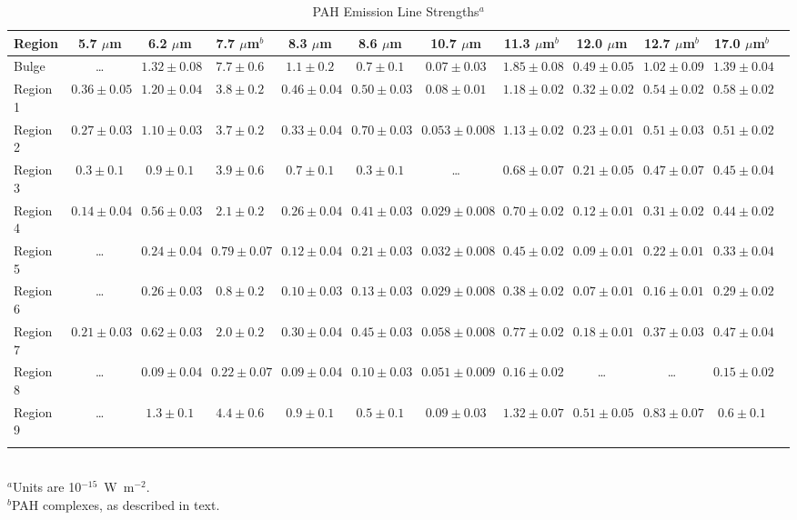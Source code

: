 \documentclass[useAMS,usenatbib,a4paper]{mn2e}
\begin{document}
\begin{table}
 \centering
 \begin{minipage}{200mm}
\caption{PAH Emission Line Strengths$^a$}
{\scriptsize
  \begin{tabular}{l c c  c  c  c  c  c  c  c  c c }
\hline
    {Region }&{5.7 $\mu$m  }&{6.2 $\mu$m  }&{7.7 $\mu$m$^b$  }&{8.3 $\mu$m  }&{8.6 $\mu$m  }&{10.7 $\mu$m  }&{11.3 $\mu$m$^b$  }&{12.0 $\mu$m  }&{12.7 $\mu$m$^b$  }&{17.0 $\mu$m$^b$  } \\
 \hline

       Bulge  & \dots & $1.32 \pm 0.08$ & $7.7 \pm 0.6$ & $1.1 \pm 0.2$ & $0.7 \pm 0.1$ & $0.07 \pm 0.03$ & $1.85 \pm 0.08$ & $0.49 \pm 0.05$ & $1.02 \pm 0.09$ & $1.39 \pm 0.04$\\
    Region 1  & $0.36 \pm 0.05$ & $1.20 \pm 0.04$ & $3.8 \pm 0.2$ & $0.46 \pm 0.04$ & $0.50 \pm 0.03$ & $0.08 \pm 0.01$ & $1.18 \pm 0.02$ & $0.32 \pm 0.02$ & $0.54 \pm 0.02$ & $0.58 \pm 0.02$\\
    Region 2  & $0.27 \pm 0.03$ & $1.10 \pm 0.03$ & $3.7 \pm 0.2$ & $0.33 \pm 0.04$ & $0.70 \pm 0.03$ & $0.053 \pm 0.008$ & $1.13 \pm 0.02$ & $0.23 \pm 0.01$ & $0.51 \pm 0.03$ & $0.51 \pm 0.02$\\
    Region 3  & $0.3 \pm 0.1$ & $0.9 \pm 0.1$ & $3.9 \pm 0.6$ & $0.7 \pm 0.1$ & $0.3 \pm 0.1$ & \dots & $0.68 \pm 0.07$ & $0.21 \pm 0.05$ & $0.47 \pm 0.07$ & $0.45 \pm 0.04$\\
    Region 4  & $0.14 \pm 0.04$ & $0.56 \pm 0.03$ & $2.1 \pm 0.2$ & $0.26 \pm 0.04$ & $0.41 \pm 0.03$ & $0.029 \pm 0.008$ & $0.70 \pm 0.02$ & $0.12 \pm 0.01$ & $0.31 \pm 0.02$ & $0.44 \pm 0.02$\\
    Region 5  & \dots & $0.24 \pm 0.04$ & $0.79 \pm 0.07$ & $0.12 \pm 0.04$ & $0.21 \pm 0.03$ & $0.032 \pm 0.008$ & $0.45 \pm 0.02$ & $0.09 \pm 0.01$ & $0.22 \pm 0.01$ & $0.33 \pm 0.04$\\
    Region 6  & \dots & $0.26 \pm 0.03$ & $0.8 \pm 0.2$ & $0.10 \pm 0.03$ & $0.13 \pm 0.03$ & $0.029 \pm 0.008$ & $0.38 \pm 0.02$ & $0.07 \pm 0.01$ & $0.16 \pm 0.01$ & $0.29 \pm 0.02$\\
    Region 7  & $0.21 \pm 0.03$ & $0.62 \pm 0.03$ & $2.0 \pm 0.2$ & $0.30 \pm 0.04$ & $0.45 \pm 0.03$ & $0.058 \pm 0.008$ & $0.77 \pm 0.02$ & $0.18 \pm 0.01$ & $0.37 \pm 0.03$ & $0.47 \pm 0.04$\\
    Region 8  & \dots & $0.09 \pm 0.04$ & $0.22 \pm 0.07$ & $0.09 \pm 0.04$ & $0.10 \pm 0.03$ & $0.051 \pm 0.009$ & $0.16 \pm 0.02$ & \dots & \dots & $0.15 \pm 0.02$\\
    Region 9  & \dots & $1.3 \pm 0.1$ & $4.4 \pm 0.6$ & $0.9 \pm 0.1$ & $0.5 \pm 0.1$ & $0.09 \pm 0.03$ & $1.32 \pm 0.07$ & $0.51 \pm 0.05$ & $0.83 \pm 0.07$ & $0.6 \pm 0.1$\\

 \hline
 \label{PAHlinetable}
\end{tabular}\\
{$^a$Units are 10$^{-15}$~W~m$^{-2}$.\\
$^b$PAH complexes, as described in text.}
}
\end{minipage}
\end{table}
\end{document}
